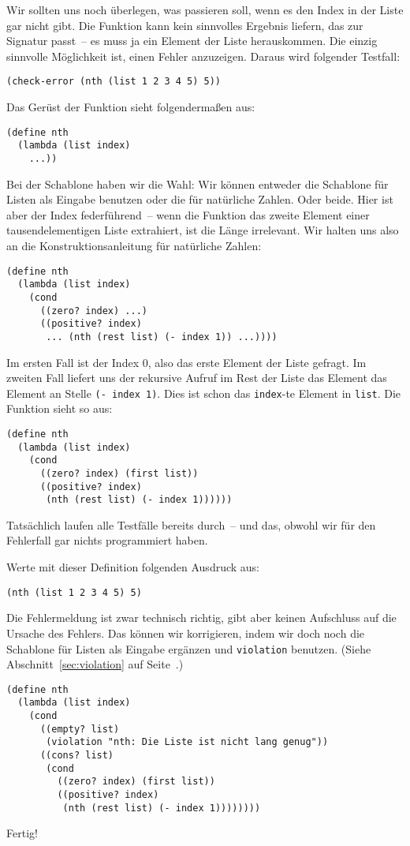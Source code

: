 %
Wir sollten uns noch überlegen, was passieren soll, wenn es den Index in der Liste gar
nicht gibt.  Die Funktion kann kein sinnvolles Ergebnis liefern, das
zur Signatur passt~-- es muss ja ein Element der Liste herauskommen.
Die einzig sinnvolle Möglichkeit ist, einen Fehler anzuzeigen.
Daraus wird folgender Testfall:
%
\begin{lstlisting}
(check-error (nth (list 1 2 3 4 5) 5))
\end{lstlisting}
%
Das Gerüst der Funktion sieht folgendermaßen aus:
%
\begin{lstlisting}
(define nth
  (lambda (list index)
    ...))
\end{lstlisting}
%
Bei der Schablone haben wir die Wahl: Wir können entweder die
Schablone für Listen als Eingabe benutzen oder die für natürliche
Zahlen.  Oder beide.  Hier ist aber der Index federführend~-- wenn die
Funktion das zweite Element einer tausendelementigen Liste extrahiert,
ist die Länge irrelevant.  Wir halten uns also an die
Konstruktionsanleitung für natürliche Zahlen:
%
\begin{lstlisting}
(define nth
  (lambda (list index)
    (cond
      ((zero? index) ...)
      ((positive? index)
       ... (nth (rest list) (- index 1)) ...))))
\end{lstlisting}
%
Im ersten Fall ist der Index 0, also das erste Element der Liste
gefragt.  Im zweiten Fall liefert uns der rekursive Aufruf im Rest der
Liste das Element das Element an Stelle \lstinline{(- index 1)}.  Dies
ist schon das \lstinline{index}-te Element in \lstinline{list}.  Die
Funktion sieht so aus:
%
\begin{lstlisting}
(define nth
  (lambda (list index)
    (cond
      ((zero? index) (first list))
      ((positive? index)
       (nth (rest list) (- index 1))))))
\end{lstlisting}
%
Tatsächlich laufen alle Testfälle bereits durch~-- und das, obwohl wir
für den Fehlerfall gar nichts programmiert haben.
\begin{aufgabe}
  Werte mit dieser Definition folgenden Ausdruck aus:
\begin{lstlisting}
(nth (list 1 2 3 4 5) 5)
\end{lstlisting}
\end{aufgabe}
%
Die Fehlermeldung ist zwar technisch richtig, gibt aber keinen
Aufschluss auf die Ursache des Fehlers.  Das können wir korrigieren,
indem wir doch noch die Schablone für Listen als Eingabe ergänzen und
\lstinline{violation} benutzen.  (Siehe Abschnitt~\ref{sec:violation} auf
Seite~\pageref{sec:violation}.)
%
\begin{lstlisting}
(define nth
  (lambda (list index)
    (cond
      ((empty? list)
       (violation "nth: Die Liste ist nicht lang genug"))
      ((cons? list)
       (cond
         ((zero? index) (first list))
         ((positive? index)
          (nth (rest list) (- index 1))))))))
\end{lstlisting}
%
Fertig!

